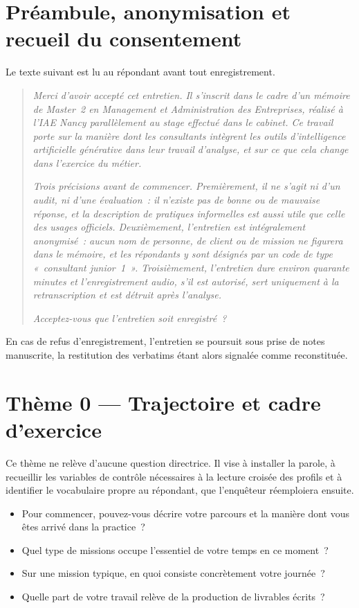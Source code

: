 \section{Préambule, anonymisation et recueil du consentement}

Le texte suivant est lu au répondant avant tout enregistrement.

\begin{quote}
\textit{Merci d'avoir accepté cet entretien. Il s'inscrit dans le cadre d'un mémoire
de Master~2 en Management et Administration des Entreprises, réalisé à l'IAE Nancy
parallèlement au stage effectué dans le cabinet. Ce travail porte sur la manière dont
les consultants intègrent les outils d'intelligence artificielle générative dans leur
travail d'analyse, et sur ce que cela change dans l'exercice du métier.}

\textit{Trois précisions avant de commencer. Premièrement, il ne s'agit ni d'un audit,
ni d'une évaluation~: il n'existe pas de bonne ou de mauvaise réponse, et la
description de pratiques informelles est aussi utile que celle des usages officiels.
Deuxièmement, l'entretien est intégralement anonymisé~: aucun nom de personne, de
client ou de mission ne figurera dans le mémoire, et les répondants y sont désignés
par un code de type «~consultant junior~1~». Troisièmement, l'entretien dure environ
quarante minutes et l'enregistrement audio, s'il est autorisé, sert uniquement à la
retranscription et est détruit après l'analyse.}

\textit{Acceptez-vous que l'entretien soit enregistré~?}
\end{quote}

En cas de refus d'enregistrement, l'entretien se poursuit sous prise de notes
manuscrite, la restitution des verbatims étant alors signalée comme reconstituée.

\section{Thème 0 --- Trajectoire et cadre d'exercice}

Ce thème ne relève d'aucune question directrice. Il vise à installer la parole, à
recueillir les variables de contrôle nécessaires à la lecture croisée des profils et à
identifier le vocabulaire propre au répondant, que l'enquêteur réemploiera ensuite.

\begin{itemize}
    \item Pour commencer, pouvez-vous décrire votre parcours et la manière dont vous
    êtes arrivé dans la practice~?
    \item Quel type de missions occupe l'essentiel de votre temps en ce moment~?
    \item Sur une mission typique, en quoi consiste concrètement votre journée~?
    \item Quelle part de votre travail relève de la production de livrables écrits~?
\end{itemize}

